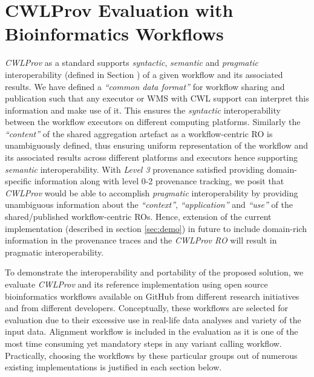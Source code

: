 \documentclass[a4paper,num-refs]{oup-contemporary}
\begin{document}
\section{CWLProv Evaluation with Bioinformatics Workflows} \label{sec:evaluation}
\textit{CWLProv} as a standard supports \textit{syntactic}, \textit{semantic} and \textit{pragmatic} interoperability (defined in Section \textbf{}) of a given workflow and its associated results. We have defined a \textit{``common data format''} for workflow sharing and publication such that any executor or WMS with CWL support can interpret this information and make use of it. This ensures the \textit{syntactic} interoperability between the workflow executors on different computing platforms. Similarly the \textit{``content''} of the shared aggregation artefact as a workflow-centric RO is unambiguously defined, thus ensuring uniform representation of the workflow and its associated results across different platforms and executors hence supporting \textit{semantic} interoperability. With \textit{Level 3} provenance satisfied providing domain-specific information along with level 0-2 provenance tracking, we posit that \textit{CWLProv} would be able to accomplish \textit{pragmatic} interoperability by providing unambiguous information about the \textit{``context''}, \textit{``application''} and \textit{``use''} of the shared/published workflow-centric ROs. Hence, extension of the current implementation (described in section \ref{sec:demo}) in future to include domain-rich information in the provenance traces and the \textit{CWLProv RO} will result in pragmatic interoperability. 

To demonstrate the interoperability and portability of the proposed solution, we evaluate \textit{CWLProv} and its reference implementation using open source bioinformatics workflows available on GitHub from different research initiatives and from different developers. Conceptually, these workflows are selected for evaluation due to their excessive use in real-life data analyses and variety of the input data. Alignment workflow is included in the evaluation as it is one of the most time consuming yet mandatory steps in any variant calling workflow. Practically, choosing the workflows by these particular groups out of numerous existing implementations is justified in each section below. 
\end{document}
